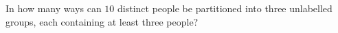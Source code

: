 In how many ways can $10$ distinct people be partitioned into three unlabelled groups, each containing at least three people?
